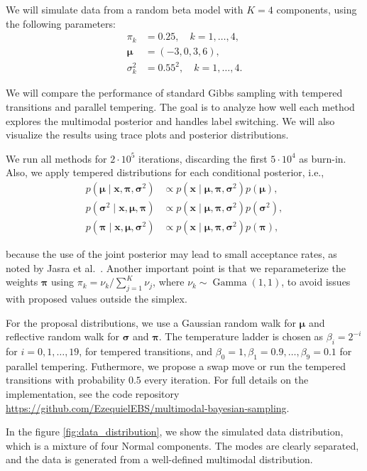 \documentclass[11pt]{article}
\newcommand{\bx}{\boldsymbol{x}}
\newcommand{\bpi}{\boldsymbol{\pi}}
\newcommand{\bmu}{\boldsymbol{\mu}}
\newcommand{\bsigma}{\boldsymbol{\sigma}}
\begin{document}
We will simulate data from a random beta model with $K = 4$ components, using the following parameters:
\begin{align*}
    \pi_k &= 0.25, \quad k = 1, \ldots, 4, \\
    \bmu &= (-3, 0, 3, 6), \\
    \sigma_k^2 &= 0.55^2, \quad k = 1, \ldots, 4.
\end{align*}

We will compare the performance of standard Gibbs sampling with tempered transitions and parallel
tempering. The goal is to analyze how well each method explores the multimodal posterior and handles
label switching. We will also visualize the results using trace plots and posterior distributions.

We run all methods for $2 \cdot 10^5$ iterations, discarding the first $5 \cdot 10^4$ as burn-in. Also,
we apply tempered distributions for each conditional posterior, i.e., 
\begin{align*}
    p(\bmu \mid \bx, \bpi, \bsigma^2) &\propto p(\bx \mid \bmu, \bpi, \bsigma^2) p(\bmu), \\
    p(\bsigma^2 \mid \bx, \bmu, \bpi) &\propto p(\bx \mid \bmu, \bpi, \bsigma^2) p(\bsigma^2), \\
    p(\bpi \mid \bx, \bmu, \bsigma^2) &\propto p(\bx \mid \bmu, \bpi, \bsigma^2) p(\bpi),
\end{align*}

because the use of the joint posterior may lead to small acceptance rates, as noted by Jasra et 
al.~\citep{jasra2005labelswitching}. Another important point is that we reparameterize the weights
$\bpi$ using $\pi_k = \nu_k / \sum_{j=1}^{K} \nu_j$, where $\nu_k \sim \operatorname{Gamma}(1, 1)$, 
to avoid issues with proposed values outside the simplex. 

For the proposal distributions, we use a Gaussian random walk for $\bmu$ and reflective random walk for
$\bsigma$ and $\bpi$. The temperature ladder is chosen as $\beta_i = 2^{-i}$ for $i = 0, 1, \ldots, 19$, 
for tempered transitions, and $\beta_0 = 1, \beta_1 = 0.9, \ldots, \beta_{9} = 0.1$ for parallel tempering.
Futhermore, we propose a swap move or run the tempered transitions with probability $0.5$ every iteration. 
For full details on the implementation, see the code repository 
\url{https://github.com/EzequielEBS/multimodal-bayesian-sampling}.

In the figure \ref{fig:data_distribution}, we show the simulated data distribution, which is a mixture of 
four Normal components. The modes are clearly separated, and the data is generated from a well-defined
multimodal distribution.
\end{document}
